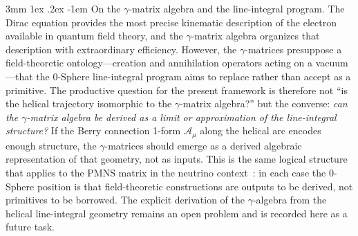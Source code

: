 \documentclass[%
 reprint, amsmath,amssymb, aps, prb, ]{revtex4-2}
\makeatletter
\numberwithin{equation}{section}
\renewcommand\paragraph{%
  \@startsection{paragraph}{4}{\z@}%
    {3mm \@plus 1ex \@minus .2ex}%
    {-1em}%
    {\normalfont\normalsize\itshape}}
\makeatother
\begin{document}
\paragraph{On the $\gamma$-matrix algebra and the line-integral program.}
The Dirac equation provides the most precise kinematic description of the electron available in quantum field theory, and the $\gamma$-matrix algebra organizes that description with extraordinary efficiency. However, the $\gamma$-matrices presuppose a field-theoretic ontology---creation and annihilation operators acting on a vacuum---that the 0-Sphere line-integral program aims to replace rather than accept as a primitive. The productive question for the present framework is therefore not ``is the helical trajectory isomorphic to the $\gamma$-matrix algebra?'' but the converse: \emph{can the $\gamma$-matrix algebra be derived as a limit or approximation of the line-integral structure?} If the Berry connection 1-form $\mathcal{A}_\mu$ along the helical arc encodes enough structure, the $\gamma$-matrices should emerge as a derived algebraic representation of that geometry, not as inputs. This is the same logical structure that applies to the PMNS matrix in the neutrino context~\cite{hanamura50}: in each case the 0-Sphere position is that field-theoretic constructions are outputs to be derived, not primitives to be borrowed. The explicit derivation of the $\gamma$-algebra from the helical line-integral geometry remains an open problem and is recorded here as a future task.
\end{document}
